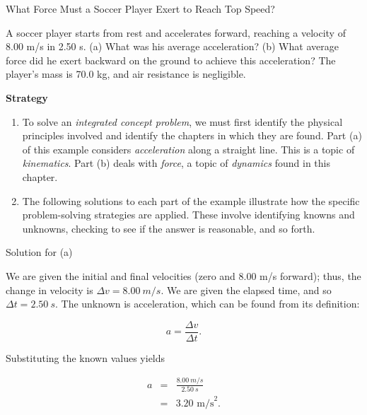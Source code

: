 \documentclass[
]{book}
\providecommand{\tightlist}{%
  \setlength{\itemsep}{0pt}\setlength{\parskip}{0pt}}
\newenvironment{tinysection}{}{}
\begin{document}
\hypertarget{fs-id2653259}{}
What Force Must a Soccer Player Exert to Reach Top Speed?

A soccer player starts from rest and accelerates forward, reaching a
velocity of 8.00 m/s in 2.50 s. (a) What was his average acceleration?
(b) What average force did he exert backward on the ground to achieve
this acceleration? The player's mass is 70.0 kg, and air resistance is
negligible.

\textbf{Strategy}

\begin{enumerate}
\def\labelenumi{\arabic{enumi}.}
\tightlist
\item
  \protect\hypertarget{import-auto-id2956703}{}{\emph{} To solve an \emph{integrated concept
  problem}, we must first identify the physical principles involved
  and identify the chapters in which they are found. Part (a) of this
  example considers \emph{acceleration} along a straight line. This is a
  topic of \emph{kinematics}. Part (b) deals with \emph{force}, a topic of
  \emph{dynamics} found in this chapter.}
\item
  \protect\hypertarget{import-auto-id3020678}{}{\emph{} The following solutions to each
  part of the example illustrate how the specific problem-solving
  strategies are applied. These involve identifying knowns and
  unknowns, checking to see if the answer is reasonable, and so
  forth.}
\end{enumerate}

\begin{tinysection}

{Solution for (a)}

\end{tinysection}

We are given the initial and final velocities (zero and 8.00 m/s
forward); thus, the change in velocity is \(\Delta v = 8.00\ m/s\). We are
given the elapsed time, and so \({\Delta t = 2.50\ s}{}\). The unknown is
acceleration, which can be found from its definition:

\leavevmode\hypertarget{eip-id1739294}{}%
\[{a = \frac{\Delta v}{\Delta t}}.\]

Substituting the known values yields

\leavevmode\hypertarget{eip-id2063281}{}%
\[\begin{array}{lll}
a & = & \frac{8.00\ m/s}{2\text{.}50\ s} \\
 & = & {3\text{.}\text{20\ m/s}^{2}.} \\
\end{array}{}\]
\end{document}
